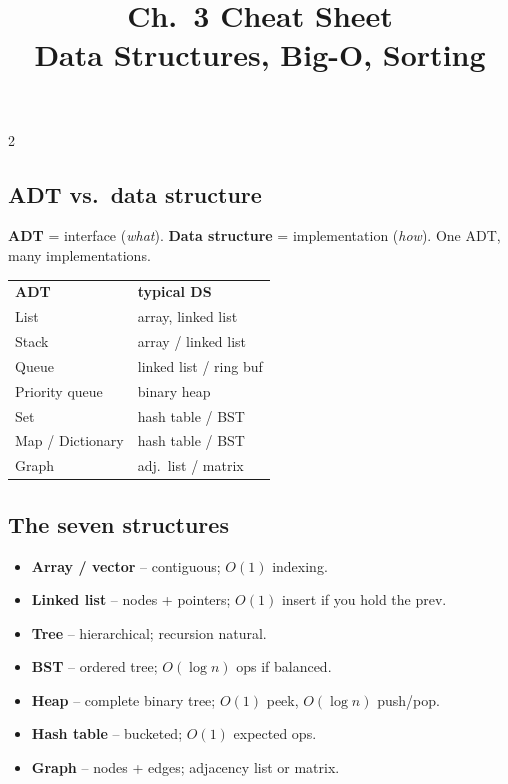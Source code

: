 \documentclass[10pt]{article}
\title{Ch.~3 Cheat Sheet\\\large Data Structures, Big-O, Sorting}
\author{}
\date{}
\begin{document}
\maketitle
\vspace{-2em}

\begin{multicols}{2}

\subsection*{ADT vs.\ data structure}
\textbf{ADT} = interface (\emph{what}). \textbf{Data structure} =
implementation (\emph{how}). One ADT, many implementations.
\begin{tabular}{@{}ll@{}}
\textbf{ADT}           & \textbf{typical DS}\\
List                   & array, linked list\\
Stack                  & array / linked list\\
Queue                  & linked list / ring buf\\
Priority queue         & binary heap\\
Set                    & hash table / BST\\
Map / Dictionary       & hash table / BST\\
Graph                  & adj.\ list / matrix
\end{tabular}

\subsection*{The seven structures}
\begin{itemize}
    \item \textbf{Array / vector} -- contiguous; $O(1)$ indexing.
    \item \textbf{Linked list} -- nodes + pointers; $O(1)$ insert if you
    hold the prev.
    \item \textbf{Tree} -- hierarchical; recursion natural.
    \item \textbf{BST} -- ordered tree; $O(\log n)$ ops if balanced.
    \item \textbf{Heap} -- complete binary tree; $O(1)$ peek, $O(\log n)$
    push/pop.
    \item \textbf{Hash table} -- bucketed; $O(1)$ expected ops.
    \item \textbf{Graph} -- nodes + edges; adjacency list or matrix.
\end{itemize}


\end{multicols}
\end{document}
